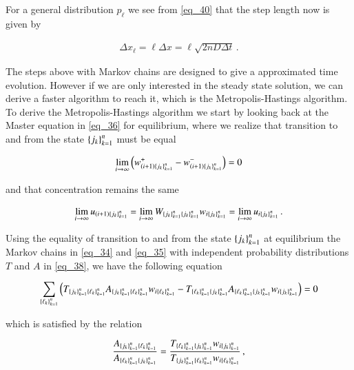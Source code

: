 \documentclass[11pt,english,a4paper]{article}
\begin{document}
\begin{flushleft}
For a general distribution $p_\ell$ we see from \eqref{eq_40} that the step length now is given by

\begin{align}
\Delta x_\ell = \ell \Delta x = \ell\sqrt{2nD\Delta t}\,.
\label{eq_42}
\end{align} 

The steps above with Markov chains are designed to give a approximated time evolution. However if we are only interested in the steady state solution, we can derive a faster algorithm to reach it, which is the Metropolis-Hastings algorithm. To derive the Metropolis-Hastings algorithm we start by looking back at the Master equation in \eqref{eq_36} for equilibrium, where we realize that transition to and from the state $\left\lbrace{j_k}\right\rbrace_{k=1}^n$ must be equal

\begin{align*}
\lim_{i\to \infty} \left({w_{(i+1)\left\lbrace{j_k}\right\rbrace_{k=1}^n}^+ - w_{(i+1)\left\lbrace{j_k}\right\rbrace_{k=1}^n}^-}\right) = 0
\end{align*}

and that concentration remains the same

\begin{align*}
\lim_{i\to \infty} u_{(i+1)\left\lbrace{j_k}\right\rbrace_{k=1}^n} = \lim_{i\to \infty} W_{\left\lbrace{j_k}\right\rbrace_{k=1}^n\left\lbrace{j_k}\right\rbrace_{k=1}^n} w_{i\left\lbrace{j_k}\right\rbrace_{k=1}^n} = \lim_{i\to\infty} u_{i\left\lbrace{j_k}\right\rbrace_{k=1}^n} \,.
\end{align*}

Using the equality of transition to and from the state $\left\lbrace{j_k}\right\rbrace_{k=1}^n$ at equilibrium the Markov chains in \eqref{eq_34} and \eqref{eq_35} with independent probability distributions $T$ and $A$ in \eqref{eq_38}, we have the following equation

\begin{align*}
\sum_{\left\lbrace{\ell_k}\right\rbrace_{k=1}^n}\left({T_{\left\lbrace{j_k}\right\rbrace_{k=1}^n \left\lbrace{\ell_k}\right\rbrace_{k=1}^n}A_{\left\lbrace{j_k}\right\rbrace_{k=1}^n \left\lbrace{\ell_k}\right\rbrace_{k=1}^n} w_{i\left\lbrace{\ell_k}\right\rbrace_{k=1}^n} - T_{\left\lbrace{\ell_k}\right\rbrace_{k=1}^n \left\lbrace{j_k}\right\rbrace_{k=1}^n}A_{\left\lbrace{\ell_k}\right\rbrace_{k=1}^n \left\lbrace{j_k}\right\rbrace_{k=1}^n} w_{i\left\lbrace{j_k}\right\rbrace_{k=1}^n}}\right) = 0
\end{align*}

which is satisfied by the relation

\begin{align*}
\frac{A_{\left\lbrace{j_k}\right\rbrace_{k=1}^n \left\lbrace{\ell_k}\right\rbrace_{k=1}^n}}{A_{\left\lbrace{\ell_k}\right\rbrace_{k=1}^n \left\lbrace{j_k}\right\rbrace_{k=1}^n}} = \frac{T_{\left\lbrace{\ell_k}\right\rbrace_{k=1}^n \left\lbrace{j_k}\right\rbrace_{k=1}^n}w_{i\left\lbrace{j_k}\right\rbrace_{k=1}^n}}{T_{\left\lbrace{j_k}\right\rbrace_{k=1}^n \left\lbrace{\ell_k}\right\rbrace_{k=1}^n}w_{i\left\lbrace{\ell_k}\right\rbrace_{k=1}^n}} \,,
\end{align*}


\end{flushleft}
\end{document}
